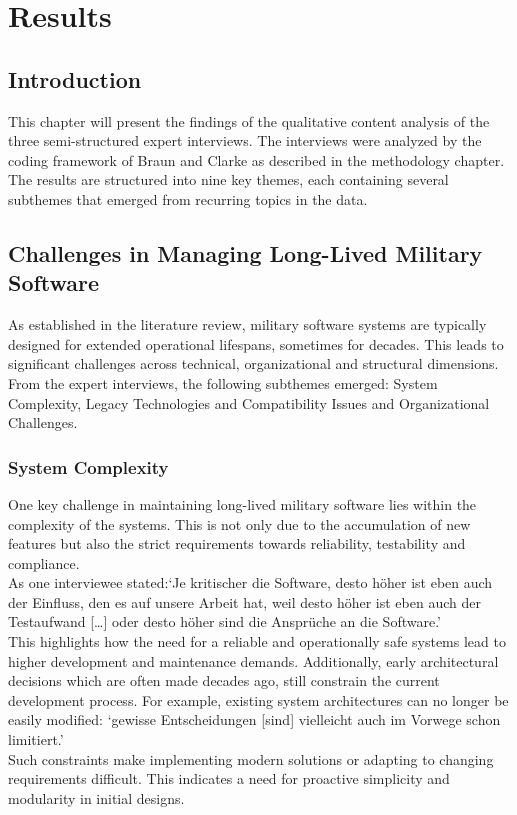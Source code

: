 \section{Results}
\subsection{Introduction}
This chapter will present the findings of the qualitative content analysis of the three semi-structured expert interviews. The interviews were analyzed by the coding framework of Braun and Clarke as described in the methodology chapter.
The results are structured into nine key themes, each containing several subthemes that emerged from recurring topics in the data.
\subsection{Challenges in Managing Long-Lived Military Software}
As established in the literature review, military software systems are typically designed for extended operational lifespans, sometimes for decades. This leads to significant challenges across technical, organizational and structural dimensions.
From the expert interviews, the following subthemes emerged: System Complexity, Legacy Technologies and Compatibility Issues and Organizational Challenges.

\subsubsection{System Complexity}
One key challenge in maintaining long-lived military software lies within the complexity of the systems. This is not only due to the accumulation of new features but also the strict requirements towards reliability, testability and compliance.\\

As one interviewee stated:`Je kritischer die Software, desto höher ist eben auch der Einfluss, den es auf unsere Arbeit hat, weil desto höher ist eben auch der Testaufwand [\ldots] oder desto höher sind die Ansprüche an die Software.'\\

This highlights how the need for a reliable and operationally safe systems lead to higher development and maintenance demands. Additionally, early architectural decisions which are often made decades ago, 
still constrain the current development process. For example, existing system architectures can no longer be easily modified: `gewisse Entscheidungen [sind] vielleicht auch im Vorwege schon limitiert.'\\
Such constraints make implementing modern solutions or adapting to changing requirements difficult. This indicates a need for proactive simplicity and modularity in initial designs.


